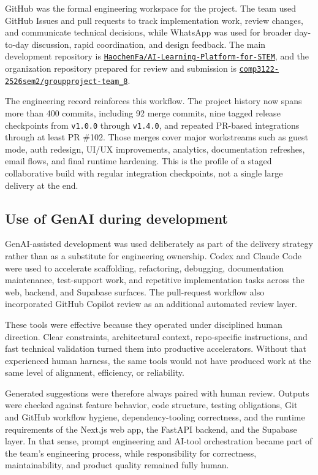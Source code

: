 \documentclass[11pt,a4paper]{article}
\newcommand{\PrimaryRepoUrl}{\href{https://github.com/HaochenFa/AI-Learning-Platform-for-STEM}{\nolinkurl{HaochenFa/AI-Learning-Platform-for-STEM}}}
\newcommand{\SubmissionRepoUrl}{\href{https://github.com/comp3122-2526sem2/groupproject-team_8}{\nolinkurl{comp3122-2526sem2/groupproject-team_8}}}
\begin{document}
GitHub was the formal engineering workspace for the project. The team used GitHub Issues and pull
requests to track implementation work, review changes, and communicate technical decisions, while
WhatsApp was used for broader day-to-day discussion, rapid coordination, and design feedback. The
main development repository is \PrimaryRepoUrl, and the organization repository prepared for
review and submission is \SubmissionRepoUrl.

The engineering record reinforces this workflow. The project history now spans more than 400
commits, including 92 merge commits, nine tagged release checkpoints from \texttt{v1.0.0} through
\texttt{v1.4.0}, and repeated PR-based integrations through at least PR \#102. Those merges cover
major workstreams such as guest mode, auth redesign, UI/UX improvements, analytics, documentation
refreshes, email flows, and final runtime hardening. This is the profile of a staged collaborative
build with regular integration checkpoints, not a single large delivery at the end.

\subsection{Use of GenAI during development}

GenAI-assisted development was used deliberately as part of the delivery strategy rather than as a
substitute for engineering ownership. Codex and Claude Code were used to accelerate scaffolding,
refactoring, debugging, documentation maintenance, test-support work, and repetitive implementation
tasks across the web, backend, and Supabase surfaces. The pull-request workflow also incorporated
GitHub Copilot review as an additional automated review layer.

These tools were effective because they operated under disciplined human direction. Clear
constraints, architectural context, repo-specific instructions, and fast technical validation turned
them into productive accelerators. Without that experienced human harness, the same tools would not
have produced work at the same level of alignment, efficiency, or reliability.

Generated suggestions were therefore always paired with human review. Outputs were checked against
feature behavior, code structure, testing obligations, Git and GitHub workflow hygiene,
dependency-tooling correctness, and the runtime requirements of the Next.js web app, the FastAPI
backend, and the Supabase layer. In that sense, prompt engineering and AI-tool orchestration became
part of the team's engineering process, while responsibility for correctness, maintainability, and
product quality remained fully human.
\end{document}
